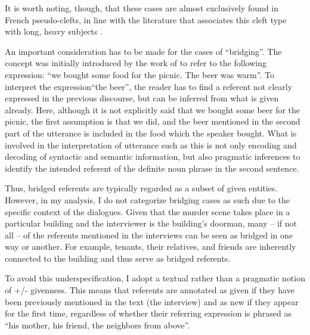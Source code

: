 It is worth noting, though, that these cases are almost exclusively found in French pseudo-clefts, in line with the literature that associates this cleft type with long, heavy subjects \parencite{blanche1990franccais, roubaud1997sujet, calude2009cleft}.

An important consideration has to be made for the cases of ``bridging”. The concept was initially introduced by the work of \textcite{clark1977} to refer to the following expression: ``we bought some food for the picnic. The beer was warm”. To interpret the expression``the beer”, the reader has to find a referent not clearly expressed in the previous discourse, but can be inferred from what is given already. Here, although it is not explicitly said that we bought some beer for the picnic, the first assumption is that we did, and the beer mentioned in the second part of the utterance is included in the food which the speaker bought. What is involved in the interpretation of utterance such as this is not only encoding and decoding of syntactic and semantic information, but also pragmatic inferences to identify the intended referent of the definite noun phrase in the second sentence. 

Thus, bridged referents are typically regarded as a subset of given entities. However, in my analysis, I do not categorize bridging cases as such due to the specific context of the dialogues. Given that the murder scene takes place in a particular building and the interviewer is the building's doorman, many -- if not all -- of the referents mentioned in the interviews can be seen as bridged in one way or another. For example, tenants, their relatives, and friends are inherently connected to the building and thus serve as bridged referents.

To avoid this underspecification, I adopt a textual rather than a pragmatic notion of +/- givenness. This means that referents are annotated as given if they have been previously mentioned in the text (the interview) and as new if they appear for the first time, regardless of whether their referring expression is phrased as ``his mother, his friend, the neighbors from above”.
 

